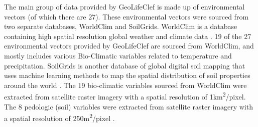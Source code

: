 \documentclass[12pt, oneside]{article}
\begin{document}
\begin{normalsize}
The main group of data provided by GeoLifeClef is made up of environmental vectors (of which there are 27). These environmental vectors were sourced from two separate databases, WorldClim and SoilGrids. WorldClim is a database containing high spatial resolution global weather and climate data \cite{hijmans2005very}. 19 of the 27 environmental vectors provided by GeoLifeClef are sourced from WorldClim, and mostly includes various Bio-Climatic variables related to temperature and precipitation. SoilGrids is another database of global digital soil mapping that uses machine learning methods to map the spatial distribution of soil properties around the world \cite{hengl2017soilgrids250m}. The 19 bio-climatic variables sourced from WorldClim were extracted from satellite raster imagery with a spatial resolution of 1km\textsuperscript{2}/pixel. The 8 pedologic (soil) variables were extracted from satellite raster imagery with a spatial resolution of 250m\textsuperscript{2}/pixel \cite{lorieul2021overview}.


\end{normalsize}
\end{document}
